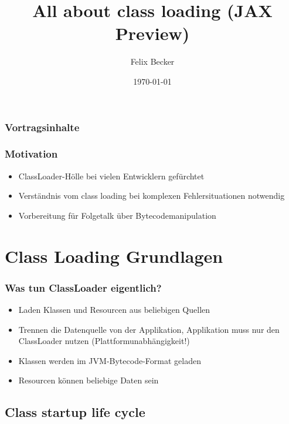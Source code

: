 \documentclass[aspectratio=169]{beamer}
\title{All about class loading (JAX Preview)}
\author{Felix Becker}
\date{\today}
\institute{REWE Systems}
\begin{document}
\maketitle


\begin{frame}
	\frametitle{Vortragsinhalte}
	\tableofcontents
\end{frame}

\begin{frame}
	\frametitle{Motivation}
	\begin{itemize}
		\item{ClassLoader-Hölle bei vielen Entwicklern gefürchtet}
		\item{Verständnis vom class loading bei komplexen Fehlersituationen notwendig}
		\item{Vorbereitung für Folgetalk über Bytecodemanipulation}
	\end{itemize}
\end{frame}

\section{Class Loading Grundlagen}

\begin{frame}
	\frametitle{Was tun ClassLoader eigentlich?}
	\begin{itemize}
		\item{Laden Klassen und Resourcen aus beliebigen Quellen}
		\item{Trennen die Datenquelle von der Applikation, Applikation muss nur den ClassLoader nutzen (Plattformunabhängigkeit!)}
		\item{Klassen werden im JVM-Bytecode-Format geladen}
		\item{Resourcen können beliebige Daten sein}
	\end{itemize}
\end{frame}

\subsection{Class startup life cycle}
\end{document}
